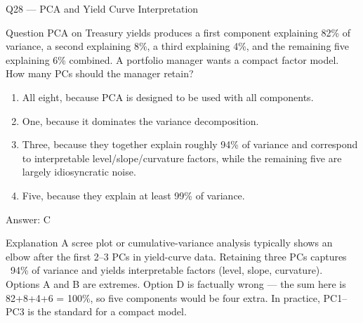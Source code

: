 \documentclass[aspectratio=169,8pt]{beamer}
\begin{document}
	\begin{frame}{Q28 --- PCA and Yield Curve Interpretation}
		\begin{block}{Question}
			PCA on Treasury yields produces a first component explaining 82\% of variance, a second explaining 8\%, a third explaining 4\%, and the remaining five explaining 6\% combined. A portfolio manager wants a compact factor model. How many PCs should the manager retain?
		\end{block}
		\begin{enumerate}
			\item All eight, because PCA is designed to be used with all components.
			\item One, because it dominates the variance decomposition.
			\item Three, because they together explain roughly 94\% of variance and correspond to interpretable level/slope/curvature factors, while the remaining five are largely idiosyncratic noise.
			\item Five, because they explain at least 99\% of variance.
		\end{enumerate}
		\begin{exampleblock}{Answer: C}\end{exampleblock}
		\begin{block}{Explanation}
			A scree plot or cumulative-variance analysis typically shows an elbow after the first 2--3 PCs in yield-curve data. Retaining three PCs captures ~94\% of variance and yields interpretable factors (level, slope, curvature). Options A and B are extremes. Option D is factually wrong --- the sum here is 82+8+4+6 = 100\%, so five components would be four extra. In practice, PC1--PC3 is the standard for a compact model.
		\end{block}
	\end{frame}
	
\end{document}
